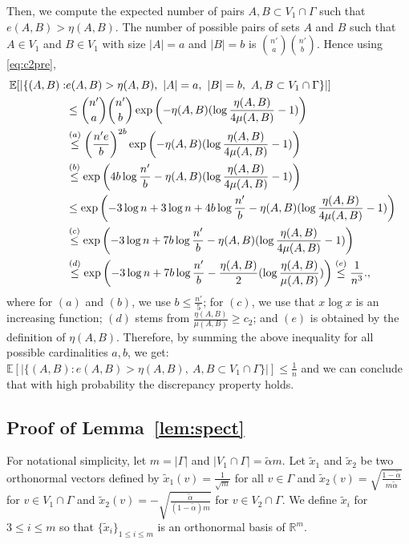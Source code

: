 Then, we compute the expected number of pairs $A,B \subset V_1
\cap \Gamma$ such that $e(A,B) > \eta(A,B)$. The number of possible pairs of sets $A$ and $B$ such that $A\in V_1$ and $B \in V_1$ with size $|A|=a$ and
$|B|=b$ is ${{n'}\choose{a}} {{n'}\choose{b}}$. Hence using \eqref{eq:c2pre}, 
\begin{align}
\mathbb{E}[|\{(A,B): & e(A,B)> \eta(A,B),~ |A|=a,~|B|=b,~A,B\subset
V_1\cap \Gamma  \}|]
\cr &  \le  {{n'}\choose{a}} {{n'}\choose{b}}\exp\left( -\eta(A,B) (\log
  \frac{\eta(A,B)}{4 \mu (A,B)}-1)\right) \cr
& \stackrel{(a)}{\le}   \left(\frac{n'e}{b}\right)^{2b} \exp\left( -\eta(A,B) (\log
  \frac{\eta(A,B)}{4 \mu (A,B)}-1)\right)\cr
&  \stackrel{(b)}{\le}  \exp\left(4b\log\frac{n'}{b} -\eta(A,B) (\log
  \frac{\eta(A,B)}{4 \mu (A,B)}-1)\right)\cr
&\le \exp\left(-3\log n + 3\log n + 4b\log\frac{n'}{b} -\eta(A,B) (\log
  \frac{\eta(A,B)}{4 \mu (A,B)}-1)\right) \cr
&\stackrel{(c)}{\le} \exp\left(-3\log n + 7b\log\frac{n'}{b} -\eta(A,B)
  (\log \frac{\eta(A,B)}{4 \mu (A,B)}-1)\right)\cr
&\stackrel{(d)}{\le} \exp\left(-3\log n + 7b\log\frac{n'}{b}
  -\frac{\eta(A,B)}{2} (\log \frac{\eta(A,B)}{\mu
    (A,B)})\right) \stackrel{(e)}{\le}\frac{1}{n^3}.,\label{eq:etabnd}
\end{align}
where for $(a)$ and $(b)$, we use $b \le \frac{n'}{5}$; for $(c)$, we use that $x \log x$ is an increasing function; $(d)$ stems from $\frac{\eta(A,B)}{\mu (A,B)} \ge c_2$; and $(e)$ is obtained by the definition of $\eta(A,B)$. Therefore, by summing the above inequality for all possible cardinalities $a,b$, we get: 
$\mathbb{E}[|\{(A,B) : e(A,B)> \eta(A,B),~A,B\subset
V_1\cap \Gamma \}|] \le \frac{1}{n}$ and we can conclude that with high probability the discrepancy property holds.


\subsection{Proof of Lemma~\ref{lem:spect}}
 For notational simplicity, let $m= | \Gamma |$ and $ |V_1 \cap \Gamma | =
  \tilde{\alpha} m.$  Let $\tilde{x}_1$ and $\tilde{x}_2$
  be two orthonormal  vectors defined by $\tilde{x}_1 (v) =
  \frac{1}{\sqrt{m}}$ for all $v\in \Gamma$ and $\tilde{x}_2 (v)=
 \sqrt{ \frac{1-\tilde{\alpha}}{m\tilde{\alpha}}}$ for $ v \in V_1 \cap \Gamma$ and $ \tilde{x}_2 (v)=
  -\sqrt{\frac{\tilde{\alpha}}{(1-\tilde{\alpha})m}}$ for $v \in V_2\cap
  \Gamma$.  We define
  $\tilde{x}_i $ for $3 \le i \le m $ so that $\{\tilde{x}_i \}_{1\le
    i \le m}$ is an orthonormal basis of $\mathbb{R}^m .$

